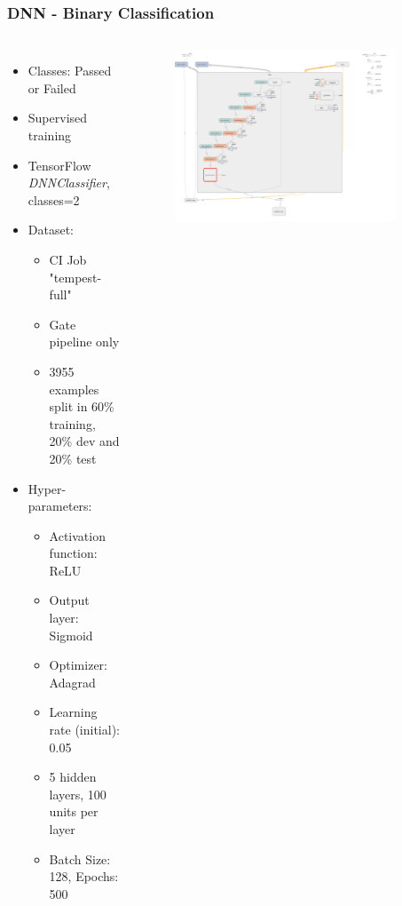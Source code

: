\documentclass[aspectratio=169,11pt,hyperref={colorlinks=true}]{beamer}
\begin{document}
\begin{frame}
    \frametitle{DNN - Binary Classification}
    \begin{columns}
        \begin{itemize}
            \item{Classes: Passed or Failed}
            \item{Supervised training}
            \item{TensorFlow \emph{DNNClassifier}, classes=2}
            \item{Dataset:}
            \begin{itemize}
              \item{CI Job "tempest-full"}
              \item{Gate pipeline only}
              \item{3955 examples split in 60\% training, 20\% dev and 20\% test}
            \end{itemize}
            \item{Hyper-parameters:}
            \begin{itemize}
              \item{Activation function: ReLU}
              \item{Output layer: Sigmoid}
              \item{Optimizer: Adagrad}
              \item{Learning rate (initial): 0.05}
              \item{5 hidden layers, 100 units per layer}
              \item{Batch Size: 128, Epochs: 500}
            \end{itemize}
        \end{itemize}
        \begin{figure}
        \begin{center}
          \includegraphics[width=0.9\textwidth]{diagrams/binary_class_network_diagram.png}

\end{center}
\end{figure}
\end{columns}
\end{frame}
\end{document}
